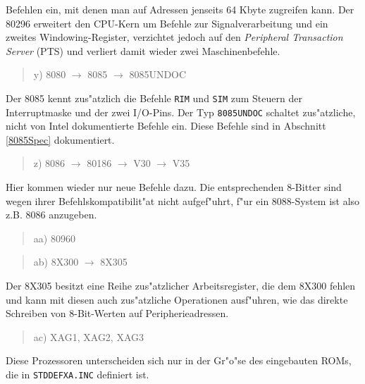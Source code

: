 \documentclass[12pt,a4paper,twoside]{report}
\newcommand{\tty}[1]{{\tt #1}}
\begin{document}
Befehlen ein, mit denen man auf Adressen jenseits 64 Kbyte zugreifen
kann.  Der 80296 erweitert den CPU-Kern um Befehle zur Signalverarbeitung
und ein zweites Windowing-Register, verzichtet jedoch auf den {\em
Peripheral Transaction Server} (PTS) und verliert damit wieder zwei
Maschinenbefehle.
\begin{quote}
y) 8080 $\rightarrow$ 8085 $\rightarrow$ 8085UNDOC
\end{quote}
Der 8085 kennt zus"atzlich die Befehle \tty{RIM} und \tty{SIM} zum Steuern der
Interruptmaske und der zwei I/O-Pins.  Der Typ {\tt 8085UNDOC} schaltet
zus"atzliche, nicht von Intel dokumentierte Befehle ein.  Diese Befehle
sind in Abschnitt \ref{8085Spec} dokumentiert.
\begin{quote}
z) 8086 $\rightarrow$ 80186 $\rightarrow$ V30 $\rightarrow$ V35
\end{quote}
Hier kommen wieder nur neue Befehle dazu.  Die entsprechenden 8-Bitter sind
wegen ihrer Befehlskompatibilit"at nicht aufgef"uhrt, f"ur ein 8088-System
ist also z.B. 8086 anzugeben.
\begin{quote}
aa) 80960
\end{quote}
\begin{quote}
ab) 8X300 $\rightarrow$ 8X305
\end{quote}
Der 8X305 besitzt eine Reihe zus"atzlicher Arbeitsregister, die dem
8X300 fehlen und kann mit diesen auch zus"atzliche Operationen ausf"uhren,
wie das direkte Schreiben von 8-Bit-Werten auf Peripherieadressen.
\begin{quote}
ac) XAG1, XAG2, XAG3
\end{quote}
Diese Prozessoren unterscheiden sich nur in der Gr"o"se des eingebauten
ROMs, die in \tty{STDDEFXA.INC} definiert ist.
\end{document}
